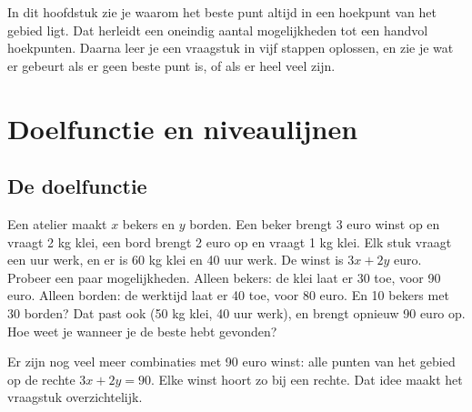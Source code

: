 In dit hoofdstuk zie je waarom het beste punt altijd in een hoekpunt van het gebied ligt. Dat herleidt een oneindig aantal mogelijkheden tot een handvol hoekpunten. Daarna leer je een vraagstuk in vijf stappen oplossen, en zie je wat er gebeurt als er geen beste punt is, of als er heel veel zijn.

\begin{oefeningen}[Start]

\end{oefeningen}


\section{Doelfunctie en niveaulijnen}

\subsection{De doelfunctie}

Een atelier maakt $x$ bekers en $y$ borden. Een beker brengt 3 euro winst op en vraagt 2 kg klei, een bord brengt 2 euro op en vraagt 1 kg klei. Elk stuk vraagt een uur werk, en er is 60 kg klei en 40 uur werk. De winst is $3x + 2y$ euro. Probeer een paar mogelijkheden. Alleen bekers: de klei laat er 30 toe, voor 90 euro. Alleen borden: de werktijd laat er 40 toe, voor 80 euro. En 10 bekers met 30 borden? Dat past ook (50 kg klei, 40 uur werk), en brengt opnieuw 90 euro op. Hoe weet je wanneer je de beste hebt gevonden?

Er zijn nog veel meer combinaties met 90 euro winst: alle punten van het gebied op de rechte $3x + 2y = 90$. Elke winst hoort zo bij een rechte. Dat idee maakt het vraagstuk overzichtelijk.

